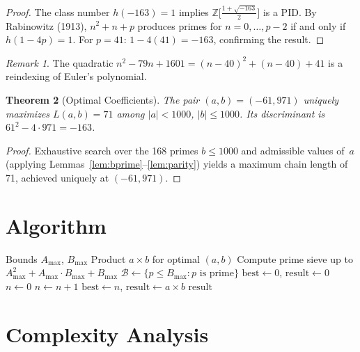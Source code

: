 \documentclass[12pt,a4paper]{article}
\newtheorem{theorem}{Theorem}
\theoremstyle{definition}
\theoremstyle{remark}
\newtheorem{remark}[theorem]{Remark}
\begin{document}
\begin{proof}
The class number $h(-163) = 1$ implies $\mathbb{Z}\bigl[\frac{1+\sqrt{-163}}{2}\bigr]$ is a PID. By Rabinowitz (1913), $n^2 + n + p$ produces primes for $n = 0, \ldots, p-2$ if and only if $h(1-4p) = 1$. For $p = 41$: $1 - 4(41) = -163$, confirming the result.
\end{proof}

\begin{remark}
The quadratic $n^2 - 79n + 1601 = (n-40)^2 + (n-40) + 41$ is a reindexing of Euler's polynomial.
\end{remark}

\begin{theorem}[Optimal Coefficients]\label{thm:optimal}
The pair $(a, b) = (-61, 971)$ uniquely maximizes $L(a,b) = 71$ among $|a| < 1000$, $|b| \leq 1000$. Its discriminant is $61^2 - 4 \cdot 971 = -163$.
\end{theorem}

\begin{proof}
Exhaustive search over the 168 primes $b \leq 1000$ and admissible values of~$a$ (applying Lemmas~\ref{lem:bprime}--\ref{lem:parity}) yields a maximum chain length of 71, achieved uniquely at $(-61, 971)$.
\end{proof}

\section{Algorithm}

\begin{algorithm}[H]
\caption{Quadratic Primes}
\begin{algorithmic}[1]
\REQUIRE Bounds $A_{\max}$, $B_{\max}$
\ENSURE Product $a \times b$ for optimal $(a, b)$
\STATE Compute prime sieve up to $A_{\max}^2 + A_{\max} \cdot B_{\max} + B_{\max}$
\STATE $\mathcal{B} \gets \{p \leq B_{\max} : p \text{ is prime}\}$
\STATE $\text{best} \gets 0$, $\text{result} \gets 0$
        \STATE $n \gets 0$
            \STATE $n \gets n + 1$
        \ENDWHILE
            \STATE $\text{best} \gets n$, $\text{result} \gets a \times b$
        \ENDIF
    \ENDFOR
\ENDFOR
\RETURN $\text{result}$
\end{algorithmic}
\end{algorithm}

\section{Complexity Analysis}
\end{document}
